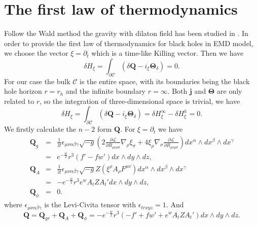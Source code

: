 \documentclass[a4paper,12pt]{article}
\numberwithin{equation}{section}
\begin{document}
\section{The first law of thermodynamics}\label{sec:03}
Follow the Wald method \cite{Wald:1993nt,Iyer:1994ys} the gravity with dilaton field has been studied in \cite{Liu:2013gja,Lu:2014maa,Liu:2017kml,Li:2020spf}.
In order to provide the first law of thermodynamics for black holes in EMD model, we choose the vector $\xi=\partial_t$ which is a time-like Killing vector. Then we have 
\begin{equation}
    \delta H_{\xi}=\int_{\partial\mathcal{C}}\left(\delta\mathbf{Q}-i_\xi \mathbf{\Theta}_\delta\right)=0.
\end{equation}
For our case the bulk $\mathcal{C}$ is the entire space, with its boundaries being the black hole horizon $r=r_h$ and the infinite boundary $r=\infty$. Both $\mathbf{j}$ and $\mathbf{\Theta}$ are only related to $r$, so the integration of three-dimensional space is trivial, we have
 \begin{equation}
    \delta H_{\xi}=\int_{\partial\mathcal{C}}\left(\delta\mathbf{Q}-i_\xi \mathbf{\Theta}_\delta\right)=\delta H_{\xi}^{\infty}-\delta H_{\xi}^{h}=0.
\end{equation}
We firstly calculate the $n-2$ form $\mathbf{Q}$. For $\xi=\partial_t$ we have \cite{Fan:2014ala,Chen:2016qks,Fan:2018qnt}
\begin{eqnarray}
    \mathbf{Q}_{g}&=&\frac{1}{3!}\epsilon_{\mu\nu\alpha\beta\gamma}\sqrt{-g}\left(2\frac{\partial\mathcal{L}}{\partial R_{\mu\nu\rho\sigma}}\nabla_\rho\xi_\sigma+4\xi_\rho\nabla_\sigma \frac{\partial\mathcal{L}}{\partial R_{\mu\nu\rho\sigma}}\right)  dx^\alpha \wedge dx^\beta \wedge dx^\gamma    \nonumber \\
    &=& e^{-\frac{w}{2}}r^3\left(f'-fw' \right)  dx \wedge dy \wedge dz,\\
    \mathbf{Q}_{A}&=&\frac{1}{3!}\epsilon_{\mu\nu\alpha\beta\gamma}\sqrt{-g}Z\left(\xi^\rho A_\rho F^{\mu\nu}\right)  dx^\alpha \wedge dx^\beta \wedge dx^\gamma  \nonumber  \\
    &=& -e^{-\frac{w}{2}}r^3 e^w A_t Z A_t'  dx \wedge dy \wedge dz,\\
     \mathbf{Q}_{\phi}&=& 0.
\end{eqnarray}
where $\epsilon_{\mu\nu\alpha\beta\gamma}$ is the Levi-Civita tensor with $\epsilon_{trxyz}=1$. And 
\begin{equation}
     \mathbf{Q}=\mathbf{Q}_{gr}+\mathbf{Q}_{A}+\mathbf{Q}_{\phi}=-e^{-\frac{w}{2}}r^3 \left(-f'+fw' +e^w A_t Z A_t'\right)  dx \wedge dy \wedge dz.
\end{equation}
\end{document}
